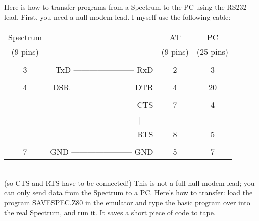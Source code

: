     Here is how to transfer programs from a Spectrum to the PC using the
    RS232 lead.  First, you need a null-modem lead.  I myself use the
    following cable:\\

\begin{tabular}{crcc}
   Spectrum &                                 &      AT    &      PC      \\
   (9 pins) &                                 &   (9 pins) &    (25 pins) \\
            &                                 &            &              \\ 
      3     & TxD ----------------------- RxD &       2    &       3      \\
            &                                 &            &              \\
      4     & DSR ----------------------- DTR &       4    &      20      \\
            &                                 &            &              \\
            &                             CTS &       7    &       4      \\
            &                          $|$~~~ &            &              \\
            &                             RTS &       8    &       5      \\
            &                                 &            &              \\
      7     & GND ----------------------- GND &       5    &       7      \\
\end{tabular}\\

\noindent
    (so CTS and RTS have to be connected!) This is not a full null-modem
    lead; you can only send data from the Spectrum to a PC\@.  Here's how to
    transfer: load the program SAVESPEC.Z80 in the emulator and type the
    basic program over into the real Spectrum, and run it.  It saves a short
    piece of code to tape.


